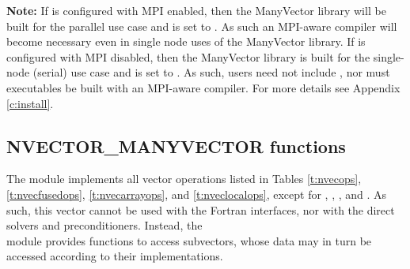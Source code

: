 \warn\textbf{Note:} If {\sundials} is configured with MPI enabled, then the
ManyVector library will be built for the parallel use case and 
is set to . As such an MPI-aware compiler will become necessary
even in single node uses of the ManyVector library. If {\sundials} is configured
with MPI disabled, then the ManyVector library is built for the single-node
(serial) use case and  is set to . As such, users need
not include , nor must executables be built with an MPI-aware
compiler. For more details see Appendix \ref{c:install}.


\subsection{NVECTOR\_MANYVECTOR functions}
\label{ss:nvec_manyvector_functions}

The {\nvecmanyvector} module implements all vector operations listed 
in Tables \ref{t:nvecops}, \ref{t:nvecfusedops}, \ref{t:nvecarrayops},
and \ref{t:nveclocalops}, except for ,
, , and
.  As such, this vector cannot be
used with the {\sundials} Fortran interfaces, nor with the {\sundials}
direct solvers and preconditioners. Instead, the \\
{\nvecmanyvector} module provides functions to access subvectors,
whose data may in turn be accessed according to their {\nvector}
implementations.

